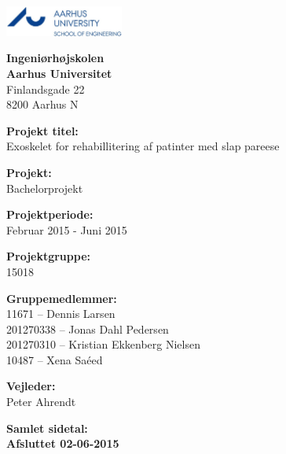 \newpage

{}


\begin{minipage}[t]{0.48\textwidth}
\vspace*{14pt}			%
\vspace{1.2cm}
\includegraphics[height=1cm]{Figures/au_ingenioerhoejskolen_en_logo.jpg} 
\end{minipage}
\hfill

\vspace*{1cm}

\begin{minipage}[t]{1\textwidth}

{\small 
\flushleft
\textbf{Ingeniørhøjskolen}\\
\textbf{Aarhus Universitet}  \\
Finlandsgade 22 \\
8200 Aarhus N \\
}

\vspace*{1cm}

\textbf{Projekt titel:} \\[5pt]\bigskip\hspace{2ex}
Exoskelet for rehabillitering af patinter med slap pareese 

\textbf{Projekt:} \\[5pt]\bigskip\hspace{2ex}
Bachelorprojekt

\textbf{Projektperiode:} \\[5pt]\bigskip\hspace{2ex}
Februar 2015 - Juni 2015

\textbf{Projektgruppe:} \\[5pt]\bigskip\hspace{2ex}
15018

\textbf{Gruppemedlemmer:} \\[5pt]\hspace*{2ex}
11671 	  -- Dennis Larsen \\\hspace*{2ex}
201270338 -- Jonas Dahl Pedersen \\\hspace*{2ex}
201270310 -- Kristian Ekkenberg Nielsen \\\hspace*{2ex}
10487 	  -- Xena Saéed \\\bigskip\hspace*{2ex}



\textbf{Vejleder:} \\[5pt]\hspace*{2ex}
Peter Ahrendt \\\bigskip\hspace{2ex}

\vspace*{1cm}

\textbf{Samlet sidetal: \pageref{LastPage}} \\
\textbf{Afsluttet 02-06-2015}


\end{minipage}
\hfill
\vfill

